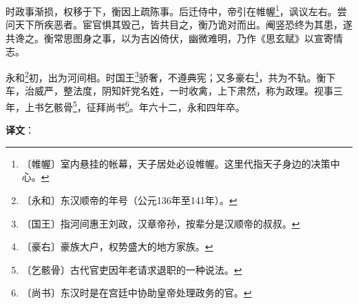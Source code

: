 \documentclass[12pt,UTF-8,openany,a4]{ctexbook}
\begin{document}
\begin{large}
    时政事渐损，权移于下，衡因上疏陈事。后迁侍中，帝引在帷幄\footnote{〔帷幄〕\yiwen 室内悬挂的帐幕，天子居处必设帷幄。这里代指天子身边的决策中心。}，讽议左右。尝问天下所疾恶者。宦官惧其毁己，皆共目之，衡乃诡对而出。阉竖恐终为其患，遂共谗之。衡常思图身之事，以为吉凶倚伏，幽微难明，乃作《思玄赋》以宣寄情志。
    
    永和\footnote{〔永和〕\yiwen 东汉顺帝的年号（公元136年至141年）。}初，出为河间相。时国王\footnote{〔国王〕\yiwen 指河间惠王刘政，汉章帝孙，按辈分是汉顺帝的叔叔。}骄奢，不遵典宪；又多豪右\footnote{〔豪右〕\yiwen 豪族大户，权势盛大的地方家族。}，共为不轨。衡下车，治威严，整法度，阴知奸党名姓，一时收禽，上下肃然，称为政理。视事三年，上书乞骸骨\footnote{〔乞骸骨〕\yiwen 古代官吏因年老请求退职的一种说法。}，征拜尚书\footnote{〔尚书〕\yiwen 东汉时是在宫廷中协助皇帝处理政务的官。}。年六十二，永和四年卒。

\end{large}


\newpage

\begin{Large}
   \noindent \textbf{译文}：
\end{Large}

\vspace{1em}
\end{document}
